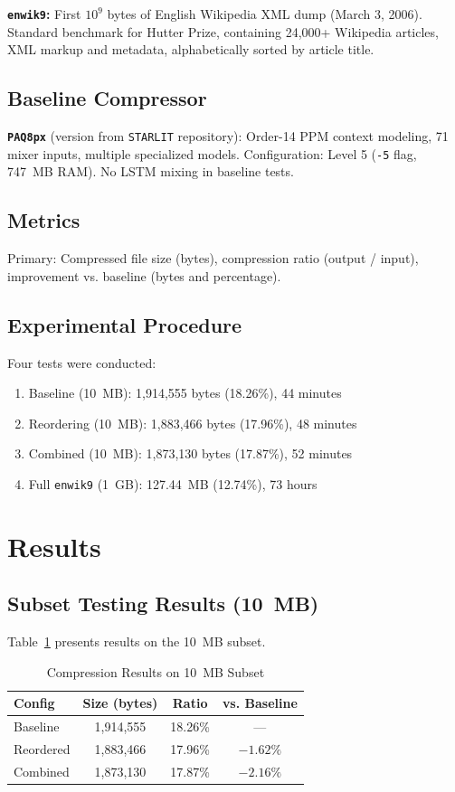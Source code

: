 \documentclass[conference]{IEEEtran}
\newcommand{\enwik}{{\tt enwik9}}
\newcommand{\paqpx}{{\tt PAQ8px}}
\newcommand{\starlit}{{\tt STARLIT}}
\begin{document}
\textbf{\enwik:} First $10^9$ bytes of English Wikipedia XML dump (March 3, 2006). Standard benchmark for Hutter Prize, containing 24,000+ Wikipedia articles, XML markup and metadata, alphabetically sorted by article title.

\subsection{Baseline Compressor}

\textbf{\paqpx} (version from \starlit{} repository): Order-14 PPM context modeling, 71 mixer inputs, multiple specialized models. Configuration: Level 5 ({\tt -5} flag, 747~MB RAM). No LSTM mixing in baseline tests.

\subsection{Metrics}

Primary: Compressed file size (bytes), compression ratio (output / input), improvement vs. baseline (bytes and percentage).

\subsection{Experimental Procedure}

Four tests were conducted:
\begin{enumerate}
    \item Baseline (10~MB): 1,914,555 bytes (18.26\%), 44 minutes
    \item Reordering (10~MB): 1,883,466 bytes (17.96\%), 48 minutes
    \item Combined (10~MB): 1,873,130 bytes (17.87\%), 52 minutes
    \item Full \enwik{} (1~GB): 127.44~MB (12.74\%), 73 hours
\end{enumerate}

\section{Results}

\subsection{Subset Testing Results (10~MB)}

Table~\ref{tab:subset_results} presents results on the 10~MB subset.

\begin{table}[htbp]
\caption{Compression Results on 10~MB Subset}
\label{tab:subset_results}
\centering
\begin{tabular}{lccc}
\toprule
\textbf{Config} & \textbf{Size (bytes)} & \textbf{Ratio} & \textbf{vs. Baseline} \\
\midrule
Baseline & 1,914,555 & 18.26\% & --- \\
Reordered & 1,883,466 & 17.96\% & $-1.62\%$ \\
Combined & 1,873,130 & 17.87\% & $-2.16\%$ \\
\bottomrule
\end{tabular}
\end{table}
\end{document}
